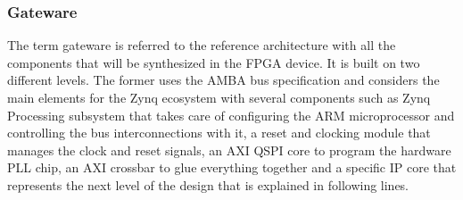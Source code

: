 
\subsubsection{Gateware}

%
%

The term gateware is referred to the reference architecture with all the components that will be synthesized in the FPGA device. It is built on two different levels. The former uses the AMBA bus specification and considers the main elements for the Zynq ecosystem with several components such as Zynq Processing subsystem that takes care of configuring the ARM microprocessor and controlling the bus interconnections with it, a reset and clocking module that manages the clock and reset signals, an AXI QSPI core to program the hardware PLL chip, an AXI crossbar to glue everything together and a specific IP core that represents the next level of the design that is explained in following lines.


